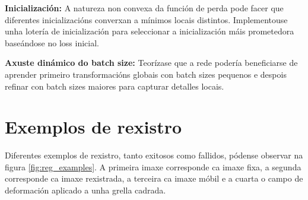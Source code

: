 \textbf{Inicialización:} A natureza non convexa da función de perda pode facer que diferentes inicializacións converxan a mínimos locais distintos. Implementouse unha lotería de inicialización para seleccionar a inicialización máis prometedora baseándose no loss inicial.

\textbf{Axuste dinámico do batch size:} Teorízase que a rede podería beneficiarse de aprender primeiro transformacións globais con batch sizes pequenos e despois refinar con batch sizes maiores para capturar detalles locais.



\section{Exemplos de rexistro}
\label{sec:Exemplos de rexistro}

Diferentes exemplos de rexistro, tanto exitosos como fallidos, pódense observar na figura \ref{fig:reg_examples}.
A primeira imaxe corresponde ca imaxe fixa, a segunda corresponde ca imaxe rexistrada, a terceira ca imaxe móbil e a cuarta o campo de deformación aplicado a unha grella cadrada.
 
